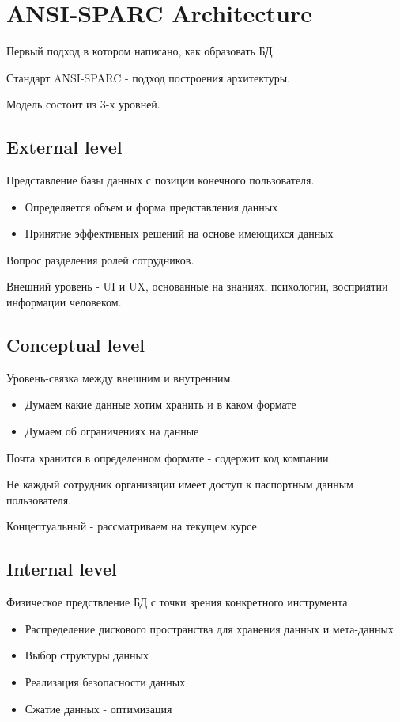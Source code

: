 \documentclass[12pt, a4paper]{article}
\begin{document}
\section{ANSI-SPARC Architecture}
Первый подход в котором написано, как образовать БД.

Стандарт ANSI-SPARC - подход построения архитектуры. 

Модель состоит из 3-х уровней.

\subsection{External level}
Представление базы данных с позиции конечного пользователя.
\begin{itemize}
    \item Определяется объем и форма представления данных
    \item Принятие эффективных решений на основе имеющихся данных
\end{itemize}

Вопрос разделения ролей сотрудников.

Внешний уровень - UI и UX, основанные на знаниях, психологии, восприятии информации человеком.

\subsection{Conceptual level}

Уровень-связка между внешним и внутренним.

\begin{itemize}
    \item Думаем какие данные хотим хранить и в каком формате
    \item Думаем об ограничениях на данные
\end{itemize}

Почта хранится в определенном формате - содержит код компании.

Не каждый сотрудник организации имеет доступ к паспортным данным пользователя.

Концептуальный - рассматриваем на текущем курсе.
\subsection{Internal level}

Физическое предствление БД с точки зрения конкретного инструмента

\begin{itemize}
    \item Распределение дискового пространства для хранения данных и мета-данных
    \item Выбор структуры данных
    \item Реализация безопасности данных
    \item Сжатие данных - оптимизация
\end{itemize}
\end{document}
